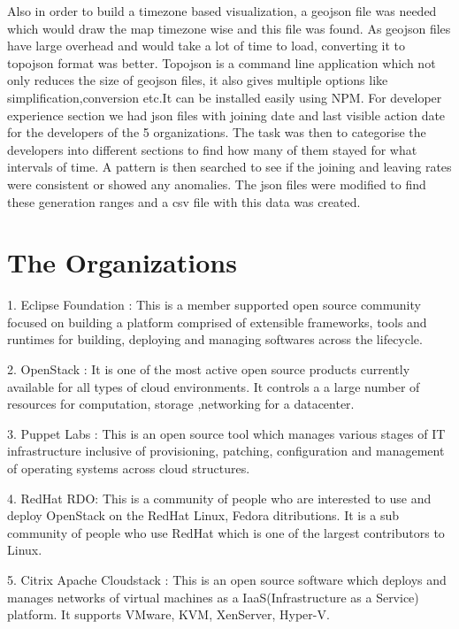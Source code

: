 \documentclass[double,12pt]{beavtex}
\begin{document}
Also in order to build a timezone based visualization, a geojson file was needed which would draw the map timezone wise and this file was found. As geojson files have large overhead and would take a lot of time to load, converting it to topojson format was better. Topojson is a command line application which not only reduces the size of geojson files, it also gives multiple options like simplification,conversion etc.It can be installed easily using NPM. For developer experience section we had json files with joining date and last visible action date for the developers of the 5 organizations. The task was then to categorise the developers into different sections to find how many of them stayed for what intervals of time. A pattern is then searched to see if the joining and leaving rates were consistent or showed any anomalies. The json files were modified to find these generation ranges and a csv file with this data was created.

\section{The Organizations}

1. Eclipse Foundation :
This is a member supported open source community focused on building a platform comprised of extensible frameworks, tools and runtimes for building, deploying and managing softwares across the lifecycle.

2. OpenStack :
It is one of the most active open source products currently available for all types of cloud environments. It controls a a large number of resources for computation, storage ,networking for a datacenter.

3. Puppet Labs :
This is an open source tool which manages various stages of IT infrastructure inclusive of provisioning, patching, configuration and management of operating systems across cloud structures.

4. RedHat RDO:
This is a community of people who are interested to use and deploy OpenStack on the RedHat Linux, Fedora ditributions. It is a sub community of people who use RedHat which is one of the largest contributors to Linux.

5. Citrix Apache Cloudstack :
This is an open source software which deploys and manages networks of virtual machines as a IaaS(Infrastructure as a Service) platform. It supports VMware, KVM, XenServer, Hyper-V.
\end{document}
